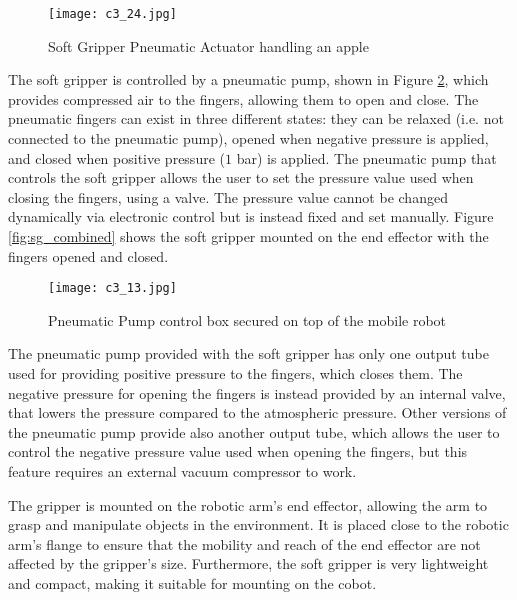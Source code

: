 \begin{figure}[t]
    \centering
    \texttt{[image: c3\_24.jpg]}
    \captionsetup{width=1\linewidth}
    \caption{Soft Gripper Pneumatic Actuator handling an apple}
    \label{fig:c3_img09}
\end{figure}

The soft gripper is controlled by a pneumatic pump, shown in Figure \ref{fig:c3_img13}, 
which provides compressed air to the fingers, allowing them to open and close.
The pneumatic fingers can exist in three different states: they can be relaxed (i.e. not connected to the pneumatic pump),
opened when negative pressure is applied, and closed when positive pressure ($1$ bar) is applied.
The pneumatic pump that controls the soft gripper allows the user to set the pressure value used when closing the fingers,
using a valve. The pressure value cannot be changed dynamically via electronic control but is instead fixed and set manually.
Figure \ref{fig:sg_combined} shows the soft gripper mounted on the end effector
with the fingers opened and closed.

\begin{figure}[t]
    \centering
    \texttt{[image: c3\_13.jpg]}
    \captionsetup{width=1\linewidth}
    \caption{Pneumatic Pump control box secured on top of the mobile robot}
    \label{fig:c3_img13}
\end{figure}

The pneumatic pump provided with the soft gripper has only one output tube used for providing positive pressure
to the fingers, which closes them. The negative pressure for opening the fingers is instead provided by an internal valve,
that lowers the pressure compared to the atmospheric pressure. 
Other versions of the pneumatic pump provide also another output tube, which allows the user to control
the negative pressure value used when opening the fingers, but this feature requires an external vacuum compressor to work.

The gripper is mounted on the robotic arm's end effector, allowing the arm to grasp and manipulate
objects in the environment. It is placed close to the robotic arm's flange to ensure
that the mobility and reach of the end effector are not affected by the gripper's size.
Furthermore, the soft gripper is very lightweight and compact, making it suitable for mounting on the cobot.

